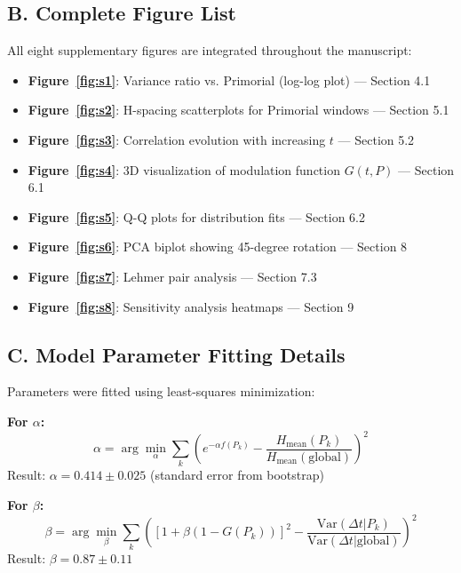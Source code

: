 \documentclass[12pt]{article}
\begin{document}
\subsection*{B. Complete Figure List}

All eight supplementary figures are integrated throughout the manuscript:

\begin{itemize}
\item \textbf{Figure~\ref{fig:s1}}: Variance ratio vs. Primorial (log-log plot) --- Section 4.1
\item \textbf{Figure~\ref{fig:s2}}: H-spacing scatterplots for Primorial windows --- Section 5.1
\item \textbf{Figure~\ref{fig:s3}}: Correlation evolution with increasing $t$ --- Section 5.2
\item \textbf{Figure~\ref{fig:s4}}: 3D visualization of modulation function $G(t,P)$ --- Section 6.1
\item \textbf{Figure~\ref{fig:s5}}: Q-Q plots for distribution fits --- Section 6.2
\item \textbf{Figure~\ref{fig:s6}}: PCA biplot showing 45-degree rotation --- Section 8
\item \textbf{Figure~\ref{fig:s7}}: Lehmer pair analysis --- Section 7.3
\item \textbf{Figure~\ref{fig:s8}}: Sensitivity analysis heatmaps --- Section 9
\end{itemize}

\subsection*{C. Model Parameter Fitting Details}

Parameters were fitted using least-squares minimization:

\textbf{For $\alpha$:}
%
\begin{equation}
\alpha = \arg\min_{\alpha} \sum_{k} \left( e^{-\alpha f(P_k)} - \frac{H_{\text{mean}}(P_k)}{H_{\text{mean}}(\text{global})} \right)^2
\end{equation}
%
Result: $\alpha = 0.414 \pm 0.025$ (standard error from bootstrap)

\textbf{For $\beta$:}
%
\begin{equation}
\beta = \arg\min_{\beta} \sum_{k} \left( [1 + \beta(1-G(P_k))]^2 - \frac{\text{Var}(\Delta t|P_k)}{\text{Var}(\Delta t|\text{global})} \right)^2
\end{equation}
%
Result: $\beta = 0.87 \pm 0.11$
\end{document}
